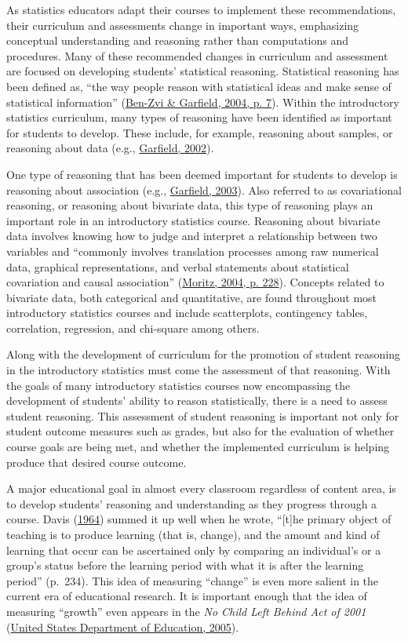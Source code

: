\documentclass[11pt]{umnthesis}
\begin{document}
As statistics educators adapt their courses to implement these recommendations, their curriculum and assessments change in important ways, emphasizing conceptual understanding and reasoning rather than computations and procedures. Many of these recommended changes in curriculum and assessment are focused on developing students' statistical reasoning. Statistical reasoning has been defined as, ``the way people reason with statistical ideas and make sense of statistical information'' (\protect\hyperlink{ref-ben-zvi:2004}{Ben-Zvi \& Garfield, 2004, p. 7}). Within the introductory statistics curriculum, many types of reasoning have been identified as important for students to develop. These include, for example, reasoning about samples, or reasoning about data (e.g., \protect\hyperlink{ref-garfield:2002}{Garfield, 2002}).

One type of reasoning that has been deemed important for students to develop is reasoning about association (e.g., \protect\hyperlink{ref-garfield:2003}{Garfield, 2003}). Also referred to as covariational reasoning, or reasoning about bivariate data, this type of reasoning plays an important role in an introductory statistics course. Reasoning about bivariate data involves knowing how to judge and interpret a relationship between two variables and ``commonly involves translation processes among raw numerical data, graphical representations, and verbal statements about statistical covariation and causal association'' (\protect\hyperlink{ref-moritz:2004}{Moritz, 2004, p. 228}). Concepts related to bivariate data, both categorical and quantitative, are found throughout most introductory statistics courses and include scatterplots, contingency tables, correlation, regression, and chi-square among others.

Along with the development of curriculum for the promotion of student reasoning in the introductory statistics must come the assessment of that reasoning. With the goals of many introductory statistics courses now encompassing the development of students' ability to reason statistically, there is a need to assess student reasoning. This assessment of student reasoning is important not only for student outcome measures such as grades, but also for the evaluation of whether course goals are being met, and whether the implemented curriculum is helping produce that desired course outcome.

A major educational goal in almost every classroom regardless of content area, is to develop students' reasoning and understanding as they progress through a course. Davis (\protect\hyperlink{ref-davis:1964}{1964}) summed it up well when he wrote, ``{[}t{]}he primary object of teaching is to produce learning (that is, change), and the amount and kind of learning that occur can be ascertained only by comparing an individual's or a group's status before the learning period with what it is after the learning period'' (p.~234). This idea of measuring ``change'' is even more salient in the current era of educational research. It is important enough that the idea of measuring ``growth'' even appears in the \emph{No Child Left Behind Act of 2001} (\protect\hyperlink{ref-usdoe:2005}{United States Department of Education, 2005}).
\end{document}
